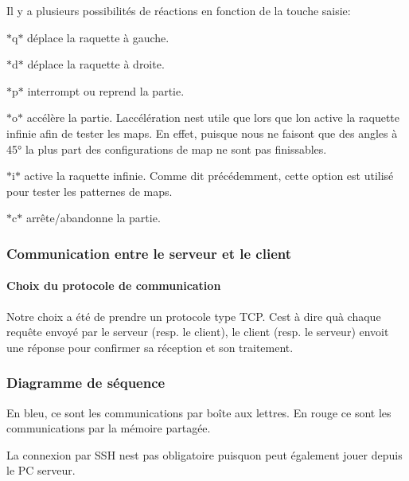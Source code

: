 Il y a plusieurs possibilités de réactions en fonction de la touche saisie\+:
\begin{DoxyItemize}
\item $\ast$\textquotesingle{}q\textquotesingle{}$\ast$ déplace la raquette à gauche.
\item $\ast$\textquotesingle{}d\textquotesingle{}$\ast$ déplace la raquette à droite.
\item $\ast$\textquotesingle{}p\textquotesingle{}$\ast$ interrompt ou reprend la partie.
\item $\ast$\textquotesingle{}o\textquotesingle{}$\ast$ accélère la partie. L\textquotesingle{}accélération n\textquotesingle{}est utile que lors que l\textquotesingle{}on active la raquette infinie afin de tester les maps. En effet, puisque nous ne faisont que des angles à 45° la plus part des configurations de map ne sont pas finissables.
\item $\ast$\textquotesingle{}i\textquotesingle{}$\ast$ active la raquette infinie. Comme dit précédemment, cette option est utilisé pour tester les patternes de maps.
\item $\ast$\textquotesingle{}c\textquotesingle{}$\ast$ arrête/abandonne la partie.
\end{DoxyItemize}

\subsubsection*{Communication entre le serveur et le client}

\paragraph*{Choix du protocole de communication}

Notre choix a été de prendre un protocole type T\+CP. C\textquotesingle{}est à dire qu\textquotesingle{}à chaque requête envoyé par le serveur (resp. le client), le client (resp. le serveur) envoit une réponse pour confirmer sa réception et son traitement.

\subsubsection*{Diagramme de séquence}

En bleu, ce sont les communications par boîte aux lettres. En rouge ce sont les communications par la mémoire partagée.



La connexion par S\+SH n\textquotesingle{}est pas obligatoire puisqu\textquotesingle{}on peut également jouer depuis le PC serveur.

